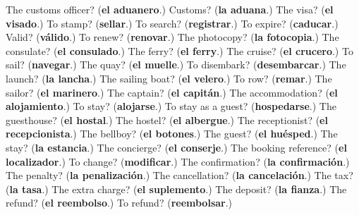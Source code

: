 \begin{tcolorbox}[breakable,colback=teal!4,colframe=teal!35!black,title={Before you move on}]
The customs officer? (\textbf{el aduanero}.) Customs? (\textbf{la aduana}.) The visa? (\textbf{el visado}.) To stamp? (\textbf{sellar}.) To search? (\textbf{registrar}.) To expire? (\textbf{caducar}.) Valid? (\textbf{válido}.) To renew? (\textbf{renovar}.) The photocopy? (\textbf{la fotocopia}.) The consulate? (\textbf{el consulado}.) The ferry? (\textbf{el ferry}.) The cruise? (\textbf{el crucero}.) To sail? (\textbf{navegar}.) The quay? (\textbf{el muelle}.) To disembark? (\textbf{desembarcar}.) The launch? (\textbf{la lancha}.) The sailing boat? (\textbf{el velero}.) To row? (\textbf{remar}.) The sailor? (\textbf{el marinero}.) The captain? (\textbf{el capitán}.) The accommodation? (\textbf{el alojamiento}.) To stay? (\textbf{alojarse}.) To stay as a guest? (\textbf{hospedarse}.) The guesthouse? (\textbf{el hostal}.) The hostel? (\textbf{el albergue}.) The receptionist? (\textbf{el recepcionista}.) The bellboy? (\textbf{el botones}.) The guest? (\textbf{el huésped}.) The stay? (\textbf{la estancia}.) The concierge? (\textbf{el conserje}.) The booking reference? (\textbf{el localizador}.) To change? (\textbf{modificar}.) The confirmation? (\textbf{la confirmación}.) The penalty? (\textbf{la penalización}.) The cancellation? (\textbf{la cancelación}.) The tax? (\textbf{la tasa}.) The extra charge? (\textbf{el suplemento}.) The deposit? (\textbf{la fianza}.) The refund? (\textbf{el reembolso}.) To refund? (\textbf{reembolsar}.)
\end{tcolorbox}
